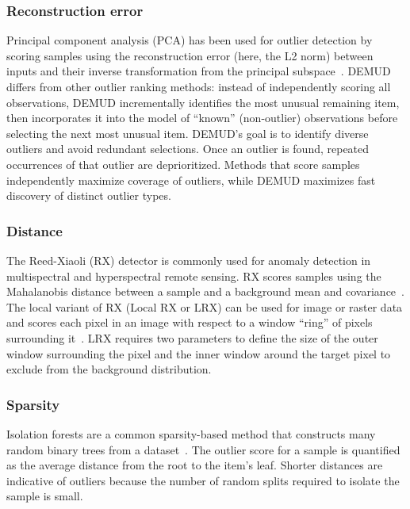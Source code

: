 \documentclass[utf8]{frontiersFPHY} %
\begin{document}
\subsubsection{Reconstruction error}
Principal component analysis (PCA) has been used for outlier detection by
scoring samples using the reconstruction error (here, the L2 norm)
between inputs and their inverse
transformation from the principal subspace~\citep{kerner2020comparison}.
DEMUD~\citep{wagstaff:demud13} differs from other
outlier ranking methods: instead of independently scoring all
observations, DEMUD incrementally identifies the most unusual
remaining item, then incorporates it into the model of ``known''
(non-outlier) observations before selecting the next most unusual
item.  DEMUD's goal is to identify diverse outliers and avoid
redundant selections.  Once an outlier is found, repeated
occurrences of that outlier are deprioritized.  Methods that score
samples independently maximize coverage of outliers, while DEMUD
maximizes fast discovery of distinct outlier types.

\subsubsection{Distance}
The 
Reed-Xiaoli (RX) detector is commonly used for anomaly detection in
multispectral and hyperspectral remote sensing. RX scores samples using
the Mahalanobis
distance between a sample and a background mean and covariance~\citep{reed1990adaptive}. The local variant of RX (Local
RX or LRX) can be used for image or raster data and scores each pixel in
an image with respect to a window ``ring'' of pixels surrounding 
it~\citep{molero2013analysis}. 
LRX requires two parameters to define the size of the outer window 
surrounding the pixel and the inner window
around the target pixel to exclude from the background distribution. 

\subsubsection{Sparsity}
Isolation forests are a common sparsity-based method
that constructs many random binary trees from a 
dataset~\cite{liu2008isolation}. The outlier score for
a sample is quantified as the average distance from the root to the item’s 
leaf. Shorter distances are indicative of outliers because the number
of random splits required to isolate the sample is small.
\end{document}
